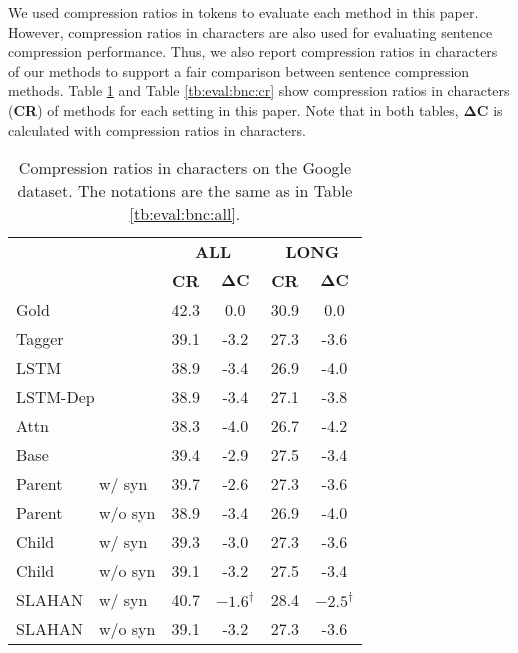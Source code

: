 \documentclass[letterpaper]{article} \usepackage{aaai20}  \usepackage{times}  \usepackage{helvet} \usepackage{courier}  \usepackage[hyphens]{url}  \usepackage{graphicx} \urlstyle{rm} \def\UrlFont{\rm}  \usepackage{graphicx}  \frenchspacing  \setlength{\pdfpagewidth}{8.5in}  \setlength{\pdfpageheight}{11in}  \usepackage{tabu}
\begin{document}
We used compression ratios in tokens to evaluate each method in this paper.
However, compression ratios in characters are also used for evaluating sentence compression performance.
Thus, we also report compression ratios in characters of our methods to support a fair comparison between sentence compression methods.
Table \ref{tb:eval:google:cr} and Table \ref{tb:eval:bnc:cr} show compression ratios in characters (\textbf{CR}) of methods for each setting in this paper.
Note that in both tables, $\mathbf{\Delta C}$ is calculated with compression ratios in characters.

\begin{table}[h]
\centering
\small
\begin{tabular}{llcccc}
\toprule
 & & \multicolumn{2}{c}{\textbf{ALL}} & \multicolumn{2}{c}{\textbf{LONG}} \\
 \cmidrule(lr){3-4}\cmidrule(lr){5-6}
 & & \textbf{CR} & $\mathbf{\Delta C}$ & \textbf{CR} & $\mathbf{\Delta C}$ \\
\midrule
\multicolumn{2}{l}{Gold}    & 42.3 & 0.0 & 30.9 & 0.0 \\
\midrule
\multicolumn{2}{l}{Tagger}  & 39.1 & -3.2 & 27.3 & -3.6 \\
\multicolumn{2}{l}{LSTM}    & 38.9 & -3.4 & 26.9 & -4.0 \\
\multicolumn{2}{l}{LSTM-Dep}& 38.9 & -3.4 & 27.1 & -3.8 \\
\multicolumn{2}{l}{Attn}    & 38.3 & -4.0 & 26.7 & -4.2 \\
\multicolumn{2}{l}{Base}    & 39.4 & -2.9 & 27.5 & -3.4 \\
Parent & w/ syn             & 39.7 & -2.6 & 27.3 & -3.6 \\
Parent & w/o syn            & 38.9 & -3.4 & 26.9 & -4.0 \\
\midrule
Child & w/ syn              & 39.3 & -3.0 & 27.3 & -3.6 \\
Child & w/o syn             & 39.1 & -3.2 & 27.5 & -3.4 \\
SLAHAN & w/ syn             & 40.7 & $\mathbf{-1.6}^{\dagger}$ & 28.4 & $\mathbf{-2.5}^{\dagger}$ \\
SLAHAN & w/o syn            & 39.1 & -3.2 & 27.3 & -3.6 \\
\bottomrule
\end{tabular}\caption{Compression ratios in characters on the Google dataset. The notations are the same as in Table \ref{tb:eval:bnc:all}.\label{tb:eval:google:cr}}
\end{table}
\end{document}
